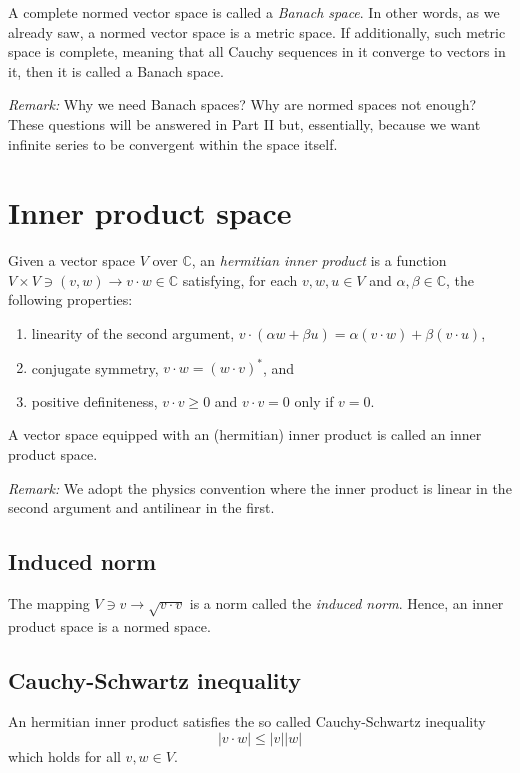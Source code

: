 \documentclass[aps,prl,twocolumn,groupedaddress]{revtex4-2}
\newcommand{\CC}{\mathbb{C}}
\begin{document}
A complete normed vector space is called a {\em Banach space}.
In other words, as we already saw, a normed vector space is a metric space.
If additionally, such metric space is complete, meaning that all Cauchy sequences in it converge to vectors in it, then it is called a Banach space.

{\em Remark:}
Why we need Banach spaces?
Why are normed spaces not enough?
These questions will be answered in Part II but, essentially, because we want infinite series  to be convergent within the space itself.

\section{Inner product space}

Given a vector space $V$ over $\CC$, an {\em hermitian inner product} is a function $V\times V\ni (v,w) \to v\cdot w \in \CC$ satisfying, for each $v,w,u\in V$ and $\alpha,\beta\in \CC$, the following properties:
\begin{enumerate}
\item linearity of the second argument, $v\cdot(\alpha w+\beta u) = \alpha (v\cdot w) + \beta (v\cdot u)$,
\item conjugate symmetry, $v\cdot w = (w\cdot v)^*$, and
\item positive definiteness, $v\cdot v\geq 0$ and $v\cdot v=0$ only if $v=0$.
\end{enumerate}
A vector space equipped with an (hermitian) inner product is called an inner product space.

{\em Remark:} We adopt the physics convention where the inner product is linear in the second argument and antilinear in the first.

\subsection{Induced norm}

The mapping $V\ni v\to \sqrt{v\cdot v}$ is a norm called the {\em induced norm}.
Hence, an inner product space is a normed space.

\subsection{Cauchy-Schwartz inequality}

An hermitian inner product satisfies the so called Cauchy-Schwartz inequality
$$
|v\cdot w| \leq |v||w|
$$
which holds for all $v,w\in V$.
\end{document}
